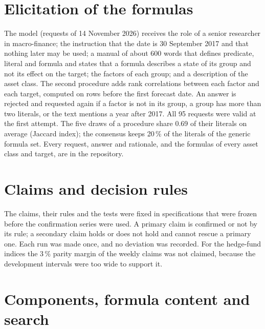 \documentclass[review]{elsarticle}
\begin{document}
\section{Elicitation of the formulas}\label{app:B}

\setcounter{table}{0}

The model (requests of 14 November 2026) receives the role of a senior researcher in macro-finance; the instruction that the date is 30 September 2017 and that nothing later may be used; a manual of about 600 words that defines predicate, literal and formula and states that a formula describes a state of its group and not its effect on the target; the factors of each group; and a description of the asset class. The second procedure adds rank correlations between each factor and each target, computed on rows before the first forecast date. An answer is rejected and requested again if a factor is not in its group, a group has more than two literals, or the text mentions a year after 2017. All 95 requests were valid at the first attempt. The five draws of a procedure share 0.69 of their literals on average (Jaccard index); the consensus keeps 20\,\% of the literals of the generic formula set. Every request, answer and rationale, and the formulas of every asset class and target, are in the repository.

\section{Claims and decision rules}\label{app:C}

\setcounter{table}{0}

The claims, their rules and the tests were fixed in specifications that were frozen before the confirmation series were used. A primary claim is confirmed or not by its rule; a secondary claim holds or does not hold and cannot rescue a primary one. Each run was made once, and no deviation was recorded. For the hedge-fund indices the 3\,\% parity margin of the weekly claims was not claimed, because the development intervals were too wide to support it.





\section{Components, formula content and search}\label{app:D}

\setcounter{table}{0}
\end{document}
